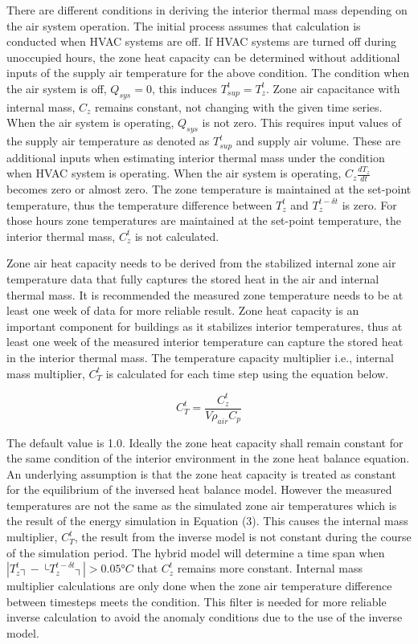 There are different conditions in deriving the interior thermal mass depending on the air system operation. The initial process assumes that calculation is conducted when HVAC systems are off. If HVAC systems are turned off during unoccupied hours, the zone heat capacity can be determined without additional inputs of the supply air temperature for the above condition. The condition when the air system is off, $Q_{sys}=0$, this induces $T_{sup}^t=T_z^t$.  Zone air capacitance with internal mass, $C_z$  remains constant, not changing with the given time series. When the air system is operating, $Q_{sys}$ is not zero. This requires input values of the supply air temperature as denoted as $T_{sup}^t$ and supply air volume. These are additional inputs when estimating interior thermal mass under the condition when HVAC system is operating. When the air system is operating, $C_z \frac {dT_z} {dt}$ becomes zero or almost zero. The zone temperature is maintained at the set-point temperature, thus the temperature difference between $T_z^t$  and $T_z^{t-\delta t}$ is zero. For those hours zone temperatures are maintained at the set-point temperature, the interior thermal mass, $C_z^t$ is not calculated. 

Zone air heat capacity needs to be derived from the stabilized internal zone air temperature data that fully captures the stored heat in the air and internal thermal mass. It is recommended the measured zone temperature needs to be at least one week of data for more reliable result. Zone heat capacity is an important component for buildings as it stabilizes interior temperatures, thus at least one week of the measured interior temperature can capture the stored heat in the interior thermal mass. The temperature capacity multiplier i.e., internal mass multiplier, $C_T^t$ is calculated for each time step using the equation below.


\begin{equation}
C_T^t = \frac{C_z^t} {V\rho_{air} C_p}
\end{equation}

The default value is 1.0. Ideally the zone heat capacity shall remain constant for the same condition of the interior environment in the zone heat balance equation. An underlying assumption is that the zone heat capacity is treated as constant for the equilibrium of the inversed heat balance model. However the measured temperatures are not the same as the simulated zone air temperatures which is the result of the energy simulation in Equation (3). This causes the internal mass multiplier, $C_T^t$, the result from the inverse model is not constant during the course of the simulation period. The hybrid model will determine a time span when $|T_z^t ┤-├ T_z^{t-\delta t} ┤|>0.05°C$ that $C_z^t$ remains more constant. Internal mass multiplier calculations are only done when the zone air temperature difference between timesteps meets the condition. This filter is needed for more reliable inverse calculation to avoid the anomaly conditions due to the use of the inverse model.  

